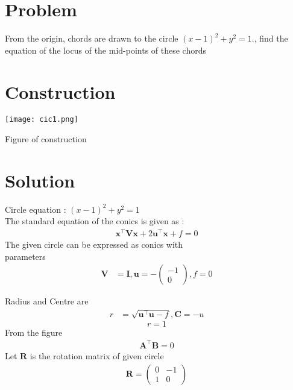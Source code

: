 \documentclass[10pt, a4paper]{article}
\title{\mytitle}
\author{\myauthor\hspace{1em}\\\contact\\FWC220\hspace{6.5em}IITH\hspace{0.5em}\mymodule\hspace{6em}Matrix:Circle}
\date{}
\newcommand{\myvec}[1]{\ensuremath{\begin{pmatrix}#1\end{pmatrix}}}
\let\vec\mathbf
\begin{document}
	\maketitle
	\tableofcontents
   \section{Problem}
  From the origin, chords are drawn to the circle 
$(x-1)^2 + y^2=1$., find the equation of the locus of the mid-points of these chords
\section{Construction}
 \texttt{[image: cic1.png]}
  	\begin{center}
  Figure of construction
  	\end{center}
  \section{Solution}

Circle equation : $(x-1)^2+y^2=1$\\
The standard equation of the conics is given as :
\begin{align}
\vec{x}^{\top}\vec{V}\vec{x}+2\vec{u}^{\top}\vec{x}+f=0
\end{align}
The given circle  can be expressed as conics with \\parameters
\begin{align}
	\vec{V} &= \vec{I}, \vec{u} = -\myvec{-1 \\0}, f = 0
	\end{align}

	Radius and Centre are
	\begin{align}
	r &=\sqrt{{\vec{u}^{\top}\vec{u}}-f },\vec{C}=-u
    \end{align}
\begin{equation}
  r=1 
\end{equation}
From the figure
\begin{align}
    \vec{A}^{\top}\vec{B}=0
\end{align}
Let $\vec{R}$ is the rotation matrix of given circle  \\\vspace{1mm}
\begin{align}
 \vec{R} = \myvec{0 & -1 \\1 & 0}
\end{align}
\end{document}
